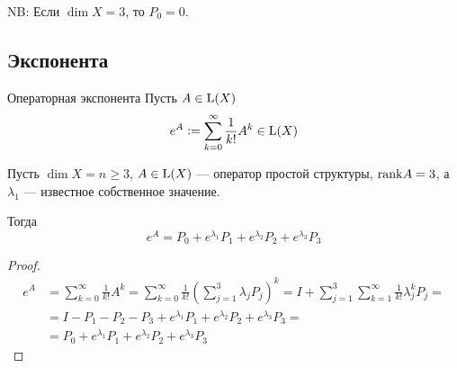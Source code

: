 NB: Если $\dim X = 3$, то $P_0 = 0$.

\subsection{Экспонента}

\begin{dfn}{Операторная экспонента}
  Пусть $A\in\mathrm{L}(X)$
  $$e^A \vcentcolon= \sum_{k=0}^\infty \frac{1}{k!} A^k \in\mathrm{L}(X)$$
\end{dfn}

\begin{thm}
  Пусть $\dim X = n \geq 3$, $A\in\mathrm{L}(X)$ --- оператор простой структуры, $\mathrm{rank} A = 3$,
  а $\lambda_1$ --- известное собственное значение.

  Тогда
  $$e^A = P_0 + e^{\lambda_1} P_1 + e^{\lambda_2} P_2 + e^{\lambda_3} P_3$$
\end{thm}
\begin{proof}
  \begin{align*}
  e^A & = \sum_{k=0}^\infty \frac{1}{k!} A^k 
    = \sum_{k=0}^\infty \frac{1}{k!} (\sum_{j=1}^3 \lambda_j P_j)^k
    = I + \sum_{j=1}^3 \sum_{k=1}^\infty \frac{1}{k!} \lambda_j^k P_j = \\
  & = I - P_1 - P_2 - P_3 + e^{\lambda_1} P_1 + e^{\lambda_2} P_2 + e^{\lambda_3} P_3 = \\
  & = P_0 +                 e^{\lambda_1} P_1 + e^{\lambda_2} P_2 + e^{\lambda_3} P_3\end{align*}
\end{proof}
